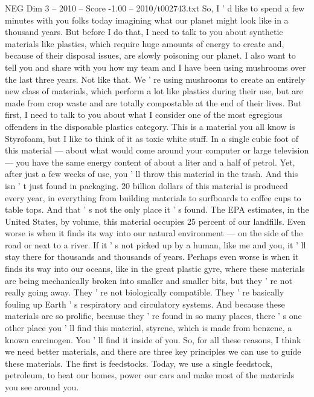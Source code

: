 \begin{textsample}{NEG Dim 3 – 2010 – Score -1.00 – 2010/t002743.txt}  \label{ex:f3_neg_026}
So, I ' d like to spend a few minutes with you folks today imagining what our planet might look like in a thousand years.
But before I do that, I need to talk to you about synthetic materials like plastics, which require huge amounts of energy to create and, because of their disposal issues, are slowly poisoning our planet.
I also want to tell you and share with you how my team and I have been using mushrooms over the last three years.
Not like that.
We ' re using mushrooms to create an entirely new class of materials, which perform a lot like plastics during their use, but are made from crop waste and are totally compostable at the end of their lives.
But first, I need to talk to you about what I consider one of the most egregious offenders in the disposable plastics category.
This is a material you all know is Styrofoam, but I like to think of it as toxic white stuff.
In a single cubic foot of this material — about what would come around your computer or large television — you have the same energy content of about a liter and a half of petrol.
Yet, after just a few weeks of use, you ' ll throw this material in the trash.
And this isn ' t just found in packaging. 20 billion dollars of this material is produced every year, in everything from building materials to surfboards to coffee cups to table tops.
And that ' s not the only place it ' s found.
The EPA estimates, in the United States, by volume, this material occupies 25 percent of our landfills.
Even worse is when it finds its way into our natural environment — on the side of the road or next to a river.
If it ' s not picked up by a human, like me and you, it ' ll stay there for thousands and thousands of years.
Perhaps even worse is when it finds its way into our oceans, like in the great plastic gyre, where these materials are being mechanically broken into smaller and smaller bits, but they ' re not really going away.
They ' re not biologically compatible.
They ' re basically fouling up Earth ' s respiratory and circulatory systems.
And because these materials are so prolific, because they ' re found in so many places, there ' s one other place you ' ll find this material, styrene, which is made from benzene, a known carcinogen.
You ' ll find it inside of you.
So, for all these reasons, I think we need better materials, and there are three key principles we can use to guide these materials.
The first is feedstocks.
Today, we use a single feedstock, petroleum, to heat our homes, power our cars and make most of the materials you see around you.

\end{textsample}
